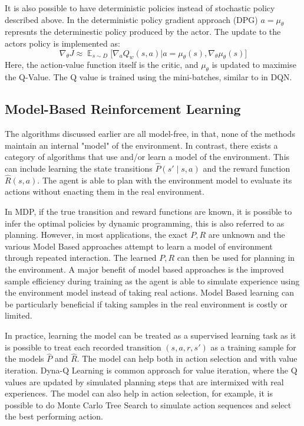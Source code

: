\documentclass[12pt,a4paper]{report}
\DeclareMathOperator{\EX}{\mathbb{E}}
\begin{document}
It is also possible to have deterministic policies instead of stochastic policy described above. In the deterministic policy gradient approach (DPG) $a = \mu_\theta$ represnts the determinestic policy produced by the actor. The update to the actors policy is implemented as:
\[
  \nabla_\theta J \approx \EX_{s \sim D}\big[\nabla_a Q_w(s,a)\big|{a=\mu_\theta(s)} ,\nabla_\theta \mu_\theta(s)\big]
\]
Here, the action-value function itself is the critic, and $\mu_\theta$ is updated to maximise the Q-Value. The Q value is trained using the mini-batches, similar to in DQN.  

\subsection{Model-Based Reinforcement Learning}
The algorithms discussed earlier are all model-free, in that, none of the methods maintain an internal "model" of the environment. In contrast, there exists a category of algorithms that use and/or learn a model of the environment. This can include learning the state transitions $\hat{P}(s' \mid s, a)$ and the reward function $\hat{R}(s, a)$. The agent is able to plan with the environment model to evaluate its actions without enacting them in the real environment. \par

In MDP, if the true transition and reward functions are known, it is possible to infer the optimal policies by dynamic programming, this is also referred to as planning. However, in most applications, the exact $P, R$ are unknown and the various Model Based approaches attempt to learn a model of environment through repeated interaction. The learned $P, R$ can then be used for planning in the environment. A major benefit of model based approaches is the improved sample efficiency during training as the agent is able to simulate experience using the environment model instead of taking real actions. Model Based learning can be particularly beneficial if taking samples in the real environment is costly or limited. \par 

In practice, learning the model can be treated as a supervised learning task as it is possible to treat each recorded transition $(s, a, r, s')$ as a training sample for the models $\hat{P}$ and $\hat{R}$. The model can help both in action selection and with value iteration. Dyna-Q Learning is common approach for value iteration, where the Q values are updated by simulated planning steps that are intermixed with real experiences. The model can also help in action selection, for example, it is possible to do Monte Carlo Tree Search to simulate action sequences and select the best performing action.\par
\end{document}
